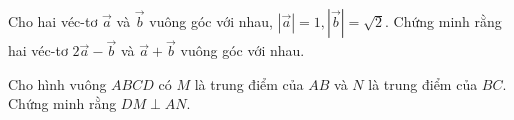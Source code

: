 \begin{vd}%
	Cho hai véc-tơ $\overrightarrow{a}$ và $\overrightarrow{b}$ vuông góc với nhau, $|\overrightarrow{a}|=1, |\overrightarrow{b}|= \sqrt{2}$. Chứng minh rằng hai véc-tơ $2\overrightarrow{a}-\overrightarrow{b}$ và $\overrightarrow{a}+\overrightarrow{b}$ vuông góc với nhau.    
\end{vd}

\begin{vd}%
	Cho hình vuông $ABCD$ có $M$ là trung điểm của $AB$ và $N$ là trung điểm của $BC$. Chứng minh rằng $DM \perp AN$.
\end{vd}

